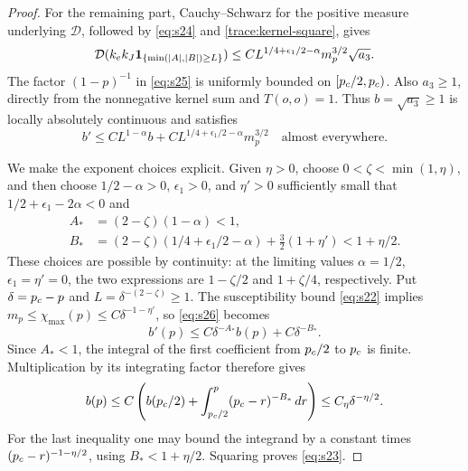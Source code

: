 \begin{proof}
For the remaining part, Cauchy--Schwarz for the positive measure
underlying $\mathcal D$, followed by \eqref{eq:s24} and
\eqref{trace:kernel-square}, gives
\[
 \mathcal D(k_e k_J\mathbf 1_{\{\min(\lvert A\rvert,\lvert B\rvert)\ge L\}})
 \le C L^{1/4+\epsilon_1/2-\alpha}m_p^{3/2}\sqrt{a_3}.
\]
The factor $(1-p)^{-1}$ in \eqref{eq:s25} is uniformly bounded
on $[{p_c}/2,{p_c})$.  Also $a_3\ge1$, directly from the nonnegative
kernel sum and $T(o,o)=1$.  Thus $b=\sqrt{a_3}\ge1$ is locally
absolutely continuous and satisfies
\begin{equation}
 b'\le C L^{1-\alpha}b
        +C L^{1/4+\epsilon_1/2-\alpha}m_p^{3/2}
 \quad\text{almost everywhere}.
 \label{eq:s26}
\end{equation}

We make the exponent choices explicit.  Given $\eta>0$, choose
$0<\zeta<\min(1,\eta)$, and then choose
$1/2-\alpha>0$, $\epsilon_1>0$, and $\eta'>0$ sufficiently small
that $1/2+\epsilon_1-2\alpha<0$ and
\begin{align*}
 A_*&=(2-\zeta)(1-\alpha)<1,\\
 B_*&=(2-\zeta)(1/4+\epsilon_1/2-\alpha)
                       +\tfrac32(1+\eta')<1+\eta/2.
\end{align*}
These choices are possible by continuity: at the limiting values
$\alpha=1/2$, $\epsilon_1=\eta'=0$, the two expressions are
$1-\zeta/2$ and $1+\zeta/4$, respectively.  Put
$\delta={p_c}-p$ and $L=\delta^{-(2-\zeta)}\ge1$.
The susceptibility bound \eqref{eq:s22} implies
$m_p\le\chi_{\max}(p)\le C\delta^{-1-\eta'}$, so
\eqref{eq:s26} becomes
\[
 b'(p)\le C\delta^{-A_*}b(p)+C\delta^{-B_*}.
\]
Since $A_*<1$, the integral of the first coefficient from
${p_c}/2$ to ${p_c}$ is finite.  Multiplication by its integrating
factor therefore gives
\[
 b(p)\le C\left(b({p_c}/2)+
                 \int_{{p_c}/2}^p({p_c}-r)^{-B_*}\,dr\right)
       \le C_\eta\delta^{-\eta/2}.
\]
For the last inequality one may bound the integrand by a constant
times $({p_c}-r)^{-1-\eta/2}$, using $B_*<1+\eta/2$.
Squaring proves \eqref{eq:s23}.
\end{proof}
